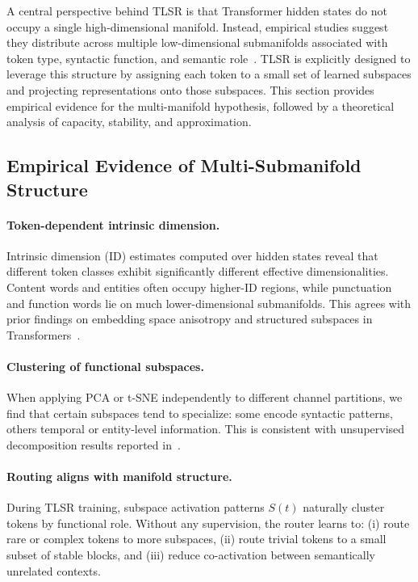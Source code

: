 \documentclass{article}
\theoremstyle{plain}
\theoremstyle{definition}
\theoremstyle{remark}
\begin{document}
A central perspective behind TLSR is that Transformer hidden states
do not occupy a single high-dimensional manifold.
Instead, empirical studies suggest they distribute across multiple
low-dimensional submanifolds associated with token type, syntactic function,
and semantic role~\cite{mickus2022muppet,huang2025ndm}.
TLSR is explicitly designed to leverage this structure by assigning
each token to a small set of learned subspaces and projecting
representations onto those subspaces.
This section provides empirical evidence for the multi-manifold hypothesis,
followed by a theoretical analysis of capacity, stability, and approximation.

\subsection{Empirical Evidence of Multi-Submanifold Structure}

\paragraph{Token-dependent intrinsic dimension.}
Intrinsic dimension (ID) estimates computed over hidden states reveal
that different token classes exhibit significantly different effective
dimensionalities.
Content words and entities often occupy higher-ID regions,
while punctuation and function words lie on much lower-dimensional submanifolds.
This agrees with prior findings on embedding space anisotropy
and structured subspaces in Transformers~\cite{mickus2022muppet}.

\paragraph{Clustering of functional subspaces.}
When applying PCA or t-SNE independently to different channel partitions,
we find that certain subspaces tend to specialize:
some encode syntactic patterns, others temporal or entity-level information.
This is consistent with unsupervised decomposition results
reported in~\cite{huang2025ndm}.

\paragraph{Routing aligns with manifold structure.}
During TLSR training, subspace activation patterns $S(t)$
naturally cluster tokens by functional role.
Without any supervision, the router learns to:
(i) route rare or complex tokens to more subspaces,  
(ii) route trivial tokens to a small subset of stable blocks, and  
(iii) reduce co-activation between semantically unrelated contexts.  
\end{document}

